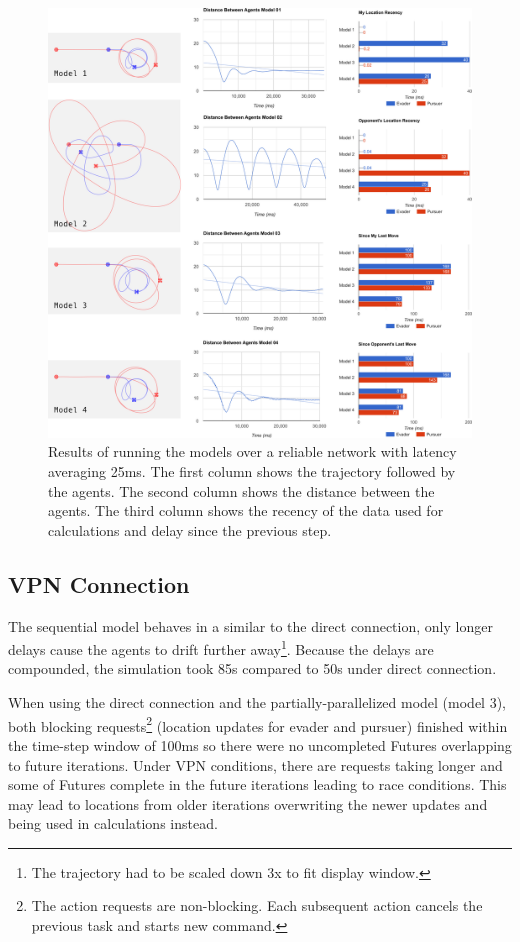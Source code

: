 \documentclass{article}
\begin{document}
\begin{figure}
	\centering
	\includegraphics[width=18.0cm]{charts-no-vpn}
	\caption{Results of running the models over a reliable network with latency averaging 25ms. The first column shows the trajectory followed by the agents. The second column shows the distance between the agents. The third column shows the recency of the data used for calculations and delay since the previous step.}\label{fig:charts-no-vpn}
\end{figure}


\subsection{VPN Connection} 
The sequential model behaves in a similar to the direct connection, only longer delays cause the agents to drift further away\footnote{The trajectory had to be scaled down 3x to fit display window.}. Because the delays are compounded, the simulation took 85s compared to 50s under direct connection. 

When using the direct connection and the partially-parallelized model (model 3), both blocking requests\footnote{The action requests are non-blocking. Each subsequent action cancels the previous task and starts new command.} (location updates for evader and pursuer) finished within the time-step window of 100ms so there were no uncompleted Futures overlapping to future iterations. Under VPN conditions, there are requests taking longer and some of Futures complete in the future iterations leading to race conditions. This may lead to locations from older iterations overwriting the newer updates and being used in calculations instead.
\end{document}
